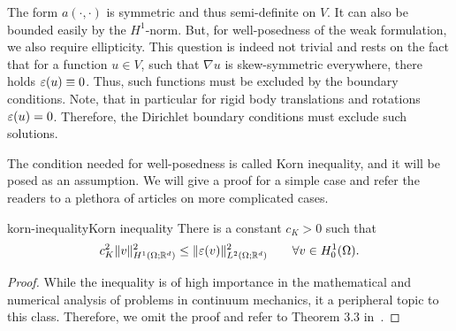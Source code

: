 \begin{intro}
  The form $a(\cdot,\cdot)$ is symmetric and thus semi-definite on $V$. It can
  also be bounded easily by the $H^1$-norm. But, for well-posedness of
  the weak formulation, we also require ellipticity. This question is
  indeed not trivial and rests on the fact that for a function
  $u\in V$, such that $\nabla u$ is skew-symmetric everywhere, there
  holds $\varepsilon(u)\equiv 0$. Thus, such functions must be excluded by
  the boundary conditions. Note, that in particular for rigid body
  translations and rotations $\varepsilon(u) = 0$. Therefore, the Dirichlet
  boundary conditions must exclude such solutions.
  
  The condition needed for well-posedness is called Korn inequality,
  and it will be posed as an assumption. We will give a proof for a
  simple case and refer the readers to a plethora of articles on more
  complicated cases.
\end{intro}

\begin{Lemma*}{korn-inequality}{Korn inequality}
  There is a constant $c_K>0$ such that
  \begin{gather}
    \label{eq:mixedintro:korn}
    c_K^2 \lVert v\rVert_{H^1(\Omega;\mathbb R^d)}^2
    \le \lVert\varepsilon(v)\rVert_{L^2(\Omega;\mathbb R^d)}^2
    \qquad\forall v\in H^1_0(\Omega).
  \end{gather}
\end{Lemma*}

\begin{proof}
  While the inequality is of high importance in the mathematical
  and numerical analysis of problems in continuum mechanics, it a
  peripheral topic to this class. Therefore, we omit the proof and
  refer to Theorem 3.3 in~\cite[Section III.3.3]{DuvautLions76}.
\end{proof}

